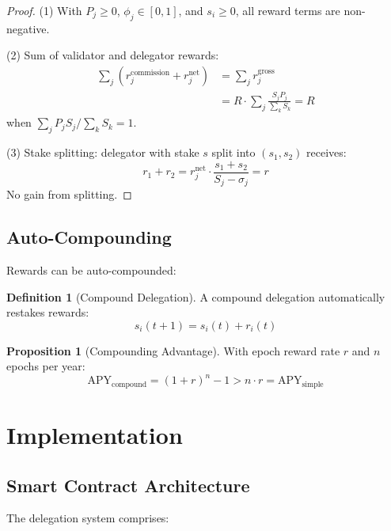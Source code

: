 \documentclass[11pt,a4paper]{article}
\theoremstyle{definition}
\newtheorem{definition}{Definition}[section]
\newtheorem{proposition}[theorem]{Proposition}
\theoremstyle{remark}
\begin{document}
\begin{proof}
(1) With $P_j \geq 0$, $\phi_j \in [0,1]$, and $s_i \geq 0$, all reward terms are non-negative.

(2) Sum of validator and delegator rewards:
\begin{align}
    \sum_j \left( r_j^{\text{commission}} + r_j^{\text{net}} \right) &= \sum_j r_j^{\text{gross}} \\
    &= R \cdot \sum_j \frac{S_j P_j}{\sum_k S_k} = R
\end{align}
when $\sum_j P_j S_j / \sum_k S_k = 1$.

(3) Stake splitting: delegator with stake $s$ split into $(s_1, s_2)$ receives:
\begin{equation}
    r_1 + r_2 = r_j^{\text{net}} \cdot \frac{s_1 + s_2}{S_j - \sigma_j} = r
\end{equation}
No gain from splitting.
\end{proof}

\subsection{Auto-Compounding}

Rewards can be auto-compounded:

\begin{definition}[Compound Delegation]
A compound delegation automatically restakes rewards:
\begin{equation}
    s_i(t+1) = s_i(t) + r_i(t)
\end{equation}
\end{definition}

\begin{proposition}[Compounding Advantage]
With epoch reward rate $r$ and $n$ epochs per year:
\begin{equation}
    \text{APY}_{\text{compound}} = (1 + r)^n - 1 > n \cdot r = \text{APY}_{\text{simple}}
\end{equation}
\end{proposition}

\section{Implementation}

\subsection{Smart Contract Architecture}

The delegation system comprises:
\end{document}
